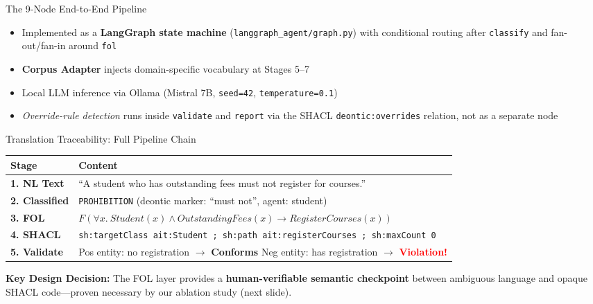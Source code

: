 \documentclass[aspectratio=169, 10pt]{beamer}
\begin{document}
\begin{frame}{The 9-Node End-to-End Pipeline}
    \vspace{0.3cm}
    \begin{itemize}
        \item Implemented as a \textbf{LangGraph state machine} (\texttt{langgraph\_agent/graph.py}) with conditional routing after \texttt{classify} and fan-out/fan-in around \texttt{fol}
        \item \textbf{Corpus Adapter} injects domain-specific vocabulary at Stages 5--7
        \item Local LLM inference via Ollama (Mistral 7B, \texttt{seed=42}, \texttt{temperature=0.1})
        \item \textit{Override-rule detection} runs inside \texttt{validate} and \texttt{report} via the SHACL \texttt{deontic:overrides} relation, not as a separate node
    \end{itemize}
\end{frame}

\begin{frame}{Translation Traceability: Full Pipeline Chain}
    \small
    \begin{tabular}{@{}lp{11cm}@{}}
        \toprule
        \textbf{Stage} & \textbf{Content} \\
        \midrule
        \textbf{1. NL Text} & ``A student who has outstanding fees must not register for courses.'' \\
        \addlinespace
        \textbf{2. Classified} & \texttt{PROHIBITION} (deontic marker: ``must not'', agent: student) \\
        \addlinespace
        \textbf{3. FOL} & $F(\forall x.\ Student(x) \wedge OutstandingFees(x) \rightarrow RegisterCourses(x))$ \\
        \addlinespace
        \textbf{4. SHACL} & \texttt{sh:targetClass ait:Student ; sh:path ait:registerCourses ; sh:maxCount 0} \\
        \addlinespace
        \textbf{5. Validate} & Pos entity: no registration $\rightarrow$ \textcolor{green!60!black}{\textbf{Conforms}} \quad Neg entity: has registration $\rightarrow$ \textcolor{red}{\textbf{Violation!}} \\
        \bottomrule
    \end{tabular}
    
    \vspace{0.4cm}
    \textbf{Key Design Decision:} The FOL layer provides a \textbf{human-verifiable semantic checkpoint} between ambiguous language and opaque SHACL code---proven necessary by our ablation study (next slide).
\end{frame}
\end{document}
